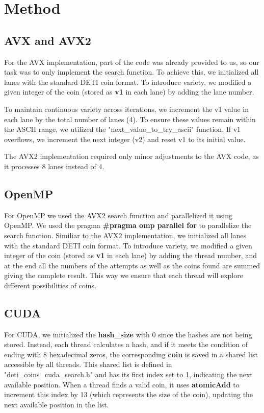 \documentclass[a4paper,12pt]{article}
\begin{document}
\section{Method}
\label{sec:method}
\subsection{AVX and AVX2}
\label{subsec:avx}

For the AVX implementation, part of the code was already provided to us, so our task was to only implement the search function. To achieve this, we initialized all lanes with the standard DETI coin format. To introduce variety, we modified a given integer of the coin (stored as \textbf{v1} in each lane) by adding the lane number.

To maintain continuous variety across iterations, we increment the v1 value in each lane by the total number of lanes (4). To ensure these values remain within the ASCII range, we utilized the "next\_value\_to\_try\_ascii" function. If v1 overflows, we increment the next integer (v2) and reset v1 to its initial value.

The AVX2 implementation required only minor adjustments to the AVX code, as it processes 8 lanes instead of 4.


\subsection{OpenMP}
\label{subsec:openmp}

For OpenMP we used the AVX2 search function and parallelized it using OpenMP.
We used the pragma \textbf{\#pragma omp parallel for} to parallelize the 
search function.
Similiar to the AVX2 implementation, we initialized all lanes with the standard
DETI coin format. To introduce variety, we modified a given integer of the coin
(stored as \textbf{v1} in each lane) by adding the thread number,
 and at the end all the numbers of the attempts as well as the coins found are summed giving the complete result.
This way we ensure that each thread will explore different possibilities of coins.

\subsection{CUDA}
\label{subsec:cuda}

For CUDA, we initialized the \textbf{hash\_size} with 0 since the hashes are not being stored. Instead, each thread calculates a hash, and if it meets the condition of ending with 8 hexadecimal zeros, the corresponding \textbf{coin} is saved in a shared list accessible by all threads. This shared list is defined in "deti\_coins\_cuda\_search.h" and has its first index set to 1, indicating the next available position. When a thread finds a valid coin, it uses \textbf{atomicAdd} to increment this index by 13 (which represents the size of the coin), updating the next available position in the list.
\end{document}
